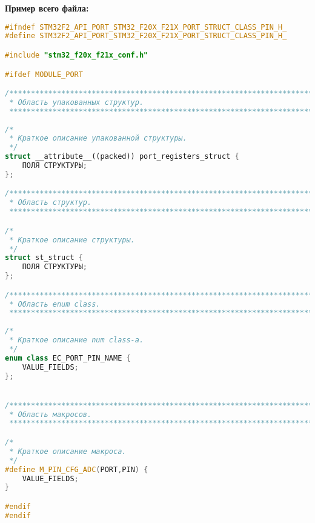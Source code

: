 \textbf{Пример всего файла:}\begin{lstlisting}[language=C++, frame=tlBR, basicstyle=\fontsize{10}{10}\ttfamily]
#ifndef STM32F2_API_PORT_STM32_F20X_F21X_PORT_STRUCT_CLASS_PIN_H_
#define STM32F2_API_PORT_STM32_F20X_F21X_PORT_STRUCT_CLASS_PIN_H_

#include "stm32_f20x_f21x_conf.h"

#ifdef MODULE_PORT

/**********************************************************************
 * Область упакованных структур.
 **********************************************************************/
 
/*
 * Краткое описание упакованной структуры.
 */
struct __attribute__((packed)) port_registers_struct {
	ПОЛЯ СТРУКТУРЫ;
};

/**********************************************************************
 * Область структур.
 **********************************************************************/

/*
 * Краткое описание структуры.
 */
struct st_struct {
	ПОЛЯ СТРУКТУРЫ;
};

/**********************************************************************
 * Область enum class.
 **********************************************************************/
 
/*
 * Краткое описание num class-а.
 */
enum class EC_PORT_PIN_NAME {
	VALUE_FIELDS;
};


/**********************************************************************
 * Область макросов.
 **********************************************************************/

/*
 * Краткое описание макроса.
 */
#define M_PIN_CFG_ADC(PORT,PIN)	{
	VALUE_FIELDS;
}

#endif
#endif\end{lstlisting}